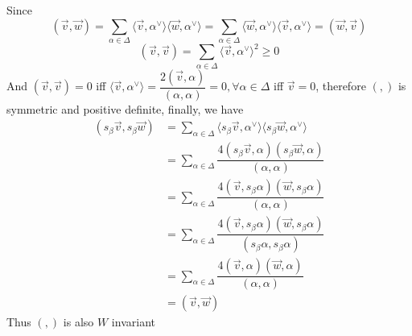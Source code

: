 \documentclass[10pt]{article}
\newcommand{\<}[1]{\langle #1 \rangle}
\begin{document}
Since$$(\vec{v},\vec{w})=\displaystyle\sum_{\alpha\in\Delta}\langle\vec{v},\alpha^\vee\rangle\langle\vec{w},\alpha^\vee\rangle=\sum_{\alpha\in\Delta}\langle\vec{w},\alpha^\vee\rangle\langle\vec{v},\alpha^\vee\rangle=(\vec{w},\vec{v})$$ $$(\vec{v},\vec{v})=\displaystyle\sum_{\alpha\in\Delta}\langle\vec{v},\alpha^\vee\rangle^2\geq0$$And $(\vec{v},\vec{v})=0$ iff $\langle\vec{v},\alpha^\vee\rangle=\dfrac{2(\vec{v},\alpha)}{(\alpha,\alpha)}=0,\forall\alpha\in\Delta$ iff $\vec{v}=0$, therefore $(,)$ is symmetric and positive definite, finally, we have \begin{align*}
(s_\beta\vec{v},s_\beta\vec{w})&=\displaystyle\sum_{\alpha\in\Delta}\langle s_\beta\vec{v},\alpha^\vee\rangle\langle s_\beta\vec{w},\alpha^\vee\rangle \\
&=\sum_{\alpha\in\Delta}\dfrac{4(s_\beta\vec{v},\alpha)(s_\beta\vec{w},\alpha)}{(\alpha,\alpha)} \\
&=\sum_{\alpha\in\Delta}\dfrac{4(\vec{v},s_\beta\alpha)(\vec{w},s_\beta\alpha)}{(\alpha,\alpha)} \\
&=\sum_{\alpha\in\Delta}\dfrac{4(\vec{v},s_\beta\alpha)(\vec{w},s_\beta\alpha)}{(s_\beta\alpha,s_\beta\alpha)} \\
&=\sum_{\alpha\in\Delta}\dfrac{4(\vec{v},\alpha)(\vec{w},\alpha)}{(\alpha,\alpha)} \\
&=(\vec{v},\vec{w})
\end{align*}Thus $(,)$ is also $W$ invariant \par
\end{document}

